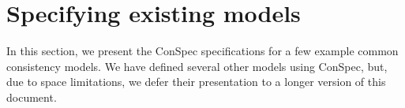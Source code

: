 \documentclass[journal, compsoc]{IEEEtran}
\begin{document}
	
	\section{Specifying existing models}\label{sec:list}
	In this section, we present the ConSpec specifications for a few example common
	consistency models. We have defined several other models using ConSpec, but, due to space limitations, we defer their presentation to a longer version of this document.
	
\end{document}
